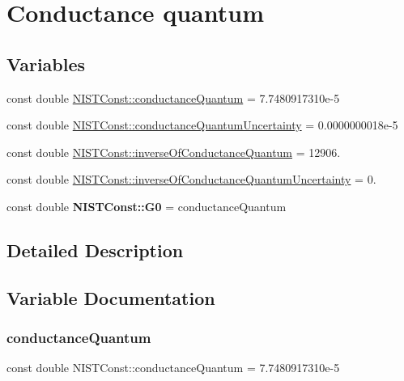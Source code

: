 \hypertarget{group___conductance_quantum}{}\section{Conductance quantum}
\label{group___conductance_quantum}
\subsection*{Variables}
\begin{DoxyCompactItemize}
\item 
const double \hyperlink{group___conductance_quantum_gac57088a56b37d0b899d3e9c9babaadaf}{N\+I\+S\+T\+Const\+::conductance\+Quantum} = 7.\+7480917310e-\/5
\item 
const double \hyperlink{group___conductance_quantum_ga599b808b8a742da1bb97cdb68f65cbf9}{N\+I\+S\+T\+Const\+::conductance\+Quantum\+Uncertainty} = 0.\+0000000018e-\/5
\item 
const double \hyperlink{group___conductance_quantum_ga39f726a47f146a434d7fca49fc2aeb30}{N\+I\+S\+T\+Const\+::inverse\+Of\+Conductance\+Quantum} = 12906.
\item 
const double \hyperlink{group___conductance_quantum_ga952c117f8b62615110f13d95c70075cd}{N\+I\+S\+T\+Const\+::inverse\+Of\+Conductance\+Quantum\+Uncertainty} = 0.
\item 
\mbox{\label{group___conductance_quantum_ga04bee7105fe6a217430a2db2913e7754}} 
const double {\bfseries N\+I\+S\+T\+Const\+::\+G0} = conductance\+Quantum
\end{DoxyCompactItemize}


\subsection{Detailed Description}


\subsection{Variable Documentation}
\mbox{\label{group___conductance_quantum_gac57088a56b37d0b899d3e9c9babaadaf}} 
\subsubsection{\texorpdfstring{conductance\+Quantum}{conductanceQuantum}}
{\footnotesize\ttfamily const double N\+I\+S\+T\+Const\+::conductance\+Quantum = 7.\+7480917310e-\/5}

